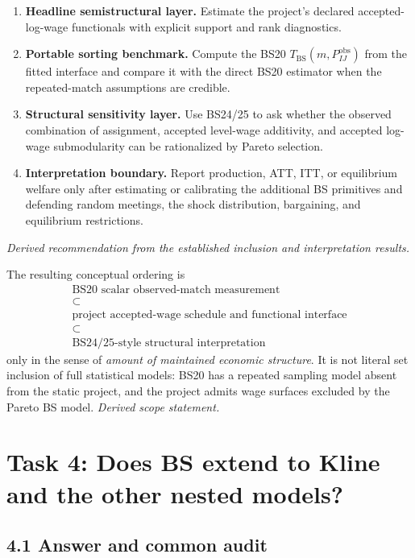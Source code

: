 \documentclass[11pt]{article}
\begin{document}
\begin{enumerate}
\item \textbf{Headline semistructural layer.}  Estimate the project's declared
  accepted-log-wage functionals with explicit support and rank diagnostics.
\item \textbf{Portable sorting benchmark.}  Compute the BS20
  \(T_{\mathrm{BS}}(m,P^{\mathrm{obs}}_{IJ})\) from the fitted interface and
  compare it with the direct BS20 estimator when the repeated-match
  assumptions are credible.
\item \textbf{Structural sensitivity layer.}  Use BS24/25 to ask whether the
  observed combination of assignment, accepted level-wage additivity, and
  accepted log-wage submodularity can be rationalized by Pareto selection.
\item \textbf{Interpretation boundary.}  Report production, ATT, ITT, or
  equilibrium welfare only after estimating or calibrating the additional BS
  primitives and defending random meetings, the shock distribution,
  bargaining, and equilibrium restrictions.
\end{enumerate}

\textit{Derived recommendation from the established inclusion and
interpretation results.}

The resulting conceptual ordering is
\[
\boxed{
\begin{array}{c}
\text{BS20 scalar observed-match measurement}\\
\subset\\
\text{project accepted-wage schedule and functional interface}\\
\subset\\
\text{BS24/25-style structural interpretation}
\end{array}}
\tag{T3.79}
\]
only in the sense of \emph{amount of maintained economic structure}.  It is
not literal set inclusion of full statistical models: BS20 has a repeated
sampling model absent from the static project, and the project admits wage
surfaces excluded by the Pareto BS model.
\textit{Derived scope statement.}

\section{Task 4: Does BS extend to Kline and the other nested models?}

\subsection{4.1 Answer and common audit}
\end{document}
